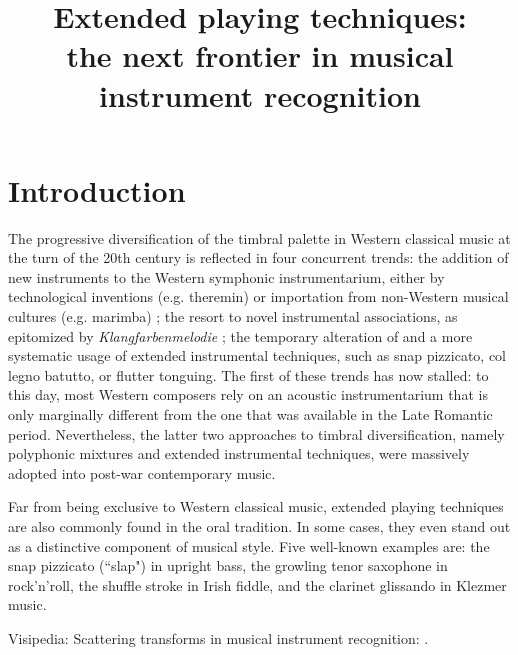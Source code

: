\documentclass{article}
\title{Extended playing techniques: \\
the next frontier in musical instrument recognition}
\begin{document}
%
\maketitle
%
\begin{abstract}

\end{abstract}
%
\section{Introduction}\label{sec:introduction}

The progressive diversification of the timbral palette in Western classical music at the turn of the 20th century is reflected in four concurrent trends:
the addition of new instruments to the Western symphonic instrumentarium, either by technological inventions (e.g. theremin) or importation from non-Western musical cultures (e.g. marimba) ; 
the resort to novel instrumental associations, as epitomized by \emph{Klangfarbenmelodie} ;
the temporary alteration of 
and a more systematic usage of extended instrumental techniques, such as snap pizzicato, col legno batutto, or flutter tonguing.
The first of these trends has now stalled: to this day, most Western composers rely on an acoustic instrumentarium that is only marginally different from the one that was available in the Late Romantic period.
Nevertheless, the latter two approaches to timbral diversification, namely polyphonic mixtures and extended instrumental techniques, were massively adopted into post-war contemporary music.



Far from being exclusive to Western classical music, extended playing techniques are also commonly found in the oral tradition.
In some cases, they even stand out as a distinctive component of musical style.
Five well-known examples are:
the snap pizzicato (``slap") in upright bass,
the growling tenor saxophone in rock'n'roll,
the shuffle stroke in Irish fiddle,
and the clarinet glissando in Klezmer music.









Visipedia: \cite{belongie2015pattern}
Scattering transforms in musical instrument recognition: \cite{lostanlen2017}.


\end{document}

